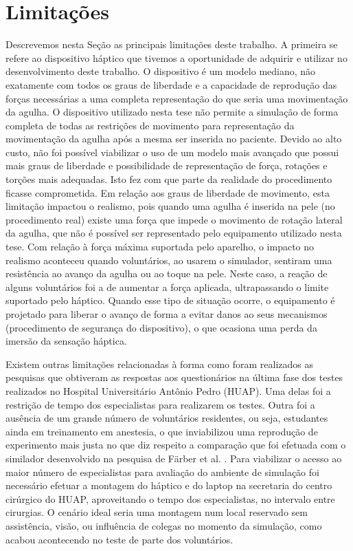 \section{Limitações}

Descrevemos nesta Seção as principais limitações deste trabalho. A primeira se refere ao dispositivo háptico que tivemos a oportunidade de adquirir e utilizar no desenvolvimento deste trabalho. O dispositivo é um modelo mediano, não exatamente com todos os graus de liberdade e a capacidade de reprodução das forças necessárias a uma completa representação do que seria uma movimentação da agulha. O dispositivo utilizado nesta tese não permite a simulação de forma completa de todas as restrições de movimento para representação da movimentação da agulha após a mesma ser inserida no paciente. Devido ao alto custo, não foi possível viabilizar o uso de um modelo mais avançado que possui mais graus de liberdade e possibilidade de representação de força, rotações e torções mais adequadas. Isto fez com que parte da realidade do procedimento ficasse comprometida. Em relação aos graus de liberdade de movimento, esta limitação impactou o realismo, pois quando uma agulha é inserida na pele (no procedimento real) existe uma força que impede o movimento de rotação lateral da agulha, que não é possível ser representado pelo equipamento utilizado nesta tese. Com relação à força máxima suportada pelo aparelho, o impacto no realismo aconteceu quando voluntários, ao usarem o simulador, sentiram uma resistência ao avanço da agulha ou ao toque na pele. Neste caso, a reação de alguns voluntários foi a de aumentar a força aplicada, ultrapassando o limite suportado pelo háptico. Quando esse tipo de situação ocorre, o equipamento é projetado para liberar o avanço de forma a evitar danos ao seus mecanismos (procedimento de segurança do dispositivo), o que ocasiona uma perda da imersão da sensação háptica.

Existem outras limitações relacionadas à forma como foram realizados as pesquisas que obtiveram as respostas aos questionários na última fase dos testes realizados no Hospital Universitário Antônio Pedro (HUAP). Uma delas foi a restrição de tempo dos especialistas para realizarem os testes. Outra foi a ausência de um grande número de voluntários residentes, ou seja, estudantes ainda em treinamento em anestesia, o que inviabilizou uma reprodução de experimento mais justa no que diz respeito a comparação que foi efetuada com o similador desenvolvido na pesquisa de Färber et al. \cite{Farber2008}. Para viabilizar o acesso ao maior número de especialistas para avaliação do ambiente de simulação foi necessário efetuar a montagem do háptico e do laptop na secretaria do centro cirúrgico do HUAP, aproveitando o tempo dos especialistas, no intervalo entre cirurgias. O cenário ideal seria uma montagem num local reservado sem assistência, visão, ou influência de colegas no momento da simulação, como acabou acontecendo no teste de parte dos voluntários. 

